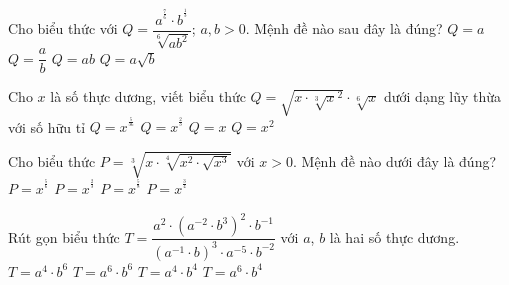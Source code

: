 \begin{ex}%
	Cho biểu thức với $Q=\dfrac{a^{^{\tfrac{7}{6}}}\cdot{b^{^{\tfrac{1}{3}}}}}{\sqrt[6]{ab^2}}$; $a, b>0$. Mệnh đề nào sau đây là đúng?
	\choice
	{\True $Q=a$}
	{$Q=\dfrac{a}{b}$}
	{$Q=ab$}
	{$Q=a\sqrt{b}$}
\end{ex}
\begin{ex}%
	Cho $x$ là số thực dương, viết biểu thức $Q=\sqrt{x\cdot \sqrt[3]x^2}\cdot \sqrt[6]x$ dưới dạng lũy thừa với số hữu tỉ
	\choice
	{$Q=x^{^{\tfrac{5}{36}}}$}
	{$Q=x^{^{\tfrac{2}{3}}}$}
	{\True $Q=x$}
	{$Q=x^2$}
\end{ex}

\begin{ex}%
	Cho biểu thức $P=\sqrt[3]{x\cdot \sqrt[4]{x^2\cdot \sqrt{x^3}}}$ với $x>0$. Mệnh đề nào dưới đây là đúng?
	\choice
	{$P=x^{^{\tfrac{5}{6}}}$}
	{$P=x^{^{\tfrac{2}{3}}}$}
	{\True $P=x^{^{\tfrac{5}{8}}}$}
	{$P=x^{^{\tfrac{3}{4}}}$}
\end{ex}

\begin{ex}%
	Rút gọn biểu thức $T=\dfrac{a^2\cdot{\left(a^{-2}\cdot b^3\right)^2}\cdot{b^{-1}}}{\left(a^{-1}\cdot b\right)^3\cdot{a^{-5}}\cdot{b^{-2}}}$ với $a$, $b$ là hai số thực dương.
	\choice
	{$T=a^4\cdot b^6$}
	{$T=a^6\cdot b^6$}
	{$T=a^4\cdot b^4$}
	{\True $T=a^6\cdot b^4$}
\end{ex}

